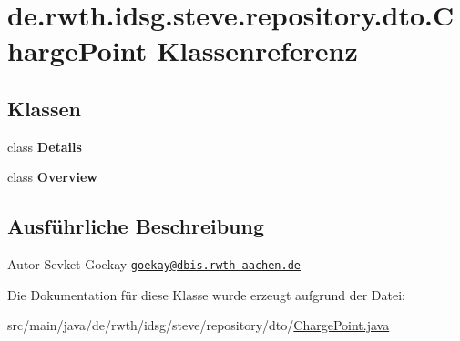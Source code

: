 \hypertarget{classde_1_1rwth_1_1idsg_1_1steve_1_1repository_1_1dto_1_1_charge_point}{\section{de.\-rwth.\-idsg.\-steve.\-repository.\-dto.\-Charge\-Point Klassenreferenz}
\label{classde_1_1rwth_1_1idsg_1_1steve_1_1repository_1_1dto_1_1_charge_point}
}
\subsection*{Klassen}
\begin{DoxyCompactItemize}
\item 
class {\bfseries Details}
\item 
class {\bfseries Overview}
\end{DoxyCompactItemize}


\subsection{Ausführliche Beschreibung}
\begin{DoxyAuthor}{Autor}
Sevket Goekay \href{mailto:goekay@dbis.rwth-aachen.de}{\tt goekay@dbis.\-rwth-\/aachen.\-de} 
\end{DoxyAuthor}


Die Dokumentation für diese Klasse wurde erzeugt aufgrund der Datei\-:\begin{DoxyCompactItemize}
\item 
src/main/java/de/rwth/idsg/steve/repository/dto/\hyperlink{_charge_point_8java}{Charge\-Point.\-java}\end{DoxyCompactItemize}
